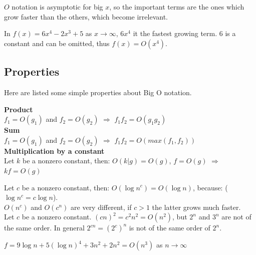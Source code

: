 \(O\) notation is asymptotic for big \(x\), so the important terms are the ones which grow faster than the others, which become irrelevant.

\begin{example}
In \(f(x) = 6x^{4} - 2x^{3} + 5\) as \(x \rightarrow \infty\), \(6x^{4}\) it the fastest growing term. \(6\) is a constant and can be omitted, thus \(f(x)=O(x^{4})\).  
\end{example}

\subsection{Properties}
Here are listed some simple properties about Big O notation.
\begin{kaobox}[frametitle=Product-Sum-Multiplication by a constant]
\textbf{Product} \\
\(f_{1}=O(g_{1})\) and \(f_{2}=O(g_{2})\) \(\Rightarrow\) \(f_{1}f_{2}=O(g_{1}g_{2})\)
\\
\textbf{Sum} \\
\(f_{1}=O(g_{1})\) and \(f_{2}=O(g_{2})\) \(\Rightarrow\) \(f_{1}f_{2}=O(max(f_{1}, f_{2}))\)
\\
\textbf{Multiplication by a constant} \\
Let \(k\) be a nonzero constant, then: 
\(O(k|g)=O(g)\), \(f=O(g)\) \(\Rightarrow\)\(kf=O(g)\)
\end{kaobox}

\begin{kaobox}[frametitle=Logarithm and Exponential]
Let \(c\) be a nonzero constant, then: \(O(\log n^{c}) = O(\log n)\), because: (\(\log n^{c} = c \log n\)).
\\
\(O(n^{c})\) and \(O(c^{n})\) are very different, if \(c>1\) the latter grows much faster.
\\
Let \(c\) be a nonzero constant. \((cn)^{2}=c^{2}n^{2} = O(n^{2})\), but \(2^{n}\) and \(3^{n}\) are not of the same order. In general \(2^{cn}=(2^{c})^{n}\) is not of the same order of \(2^{n}\).
\end{kaobox}

\begin{example}
\(f = 9 \log n + 5(\log n)^{4} + 3n^{2} + 2n^{2} = O(n^{3})\) as \(n \rightarrow \infty\)
\end{example}

